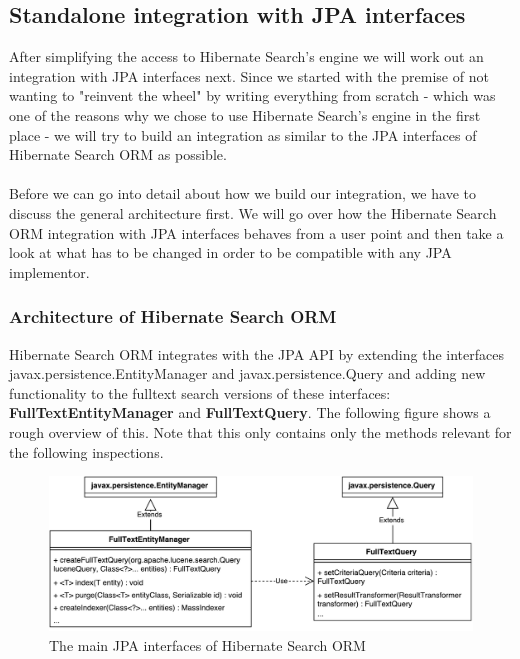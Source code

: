 \subsection{Standalone integration with JPA interfaces}
After simplifying the access to Hibernate Search's engine we will work out an integration with JPA interfaces next. Since we started with the premise of not wanting to "reinvent the wheel" by writing everything from scratch - which was one of the reasons why we chose to use Hibernate Search's engine in the first place - we will try to build an integration as similar to the JPA interfaces of Hibernate Search ORM as possible.
\\\\
Before we can go into detail about how we build our integration, we have to discuss the general architecture first. We will go over how the Hibernate Search ORM integration with JPA interfaces behaves from a user point and then take a look at what has to be changed in order to be compatible with any JPA implementor.

\subsubsection{Architecture of Hibernate Search ORM}

Hibernate Search ORM integrates with the JPA API by extending the interfaces  javax.persistence.EntityManager and javax.persistence.Query and adding new functionality to the fulltext search versions of these interfaces: \textbf{FullTextEntityManager} and \textbf{FullTextQuery}. The following figure shows a rough overview of this. Note that this only contains only the methods relevant for the following inspections.
\\
\begin{figure}[ht]
	\centering
	\includegraphics[scale=0.6]{images/hibernate_search_jpa_integration_original.pdf}
	\caption{The main JPA interfaces of Hibernate Search ORM}
	\label{hibernate_search_jpa_integration_original}
\end{figure}


